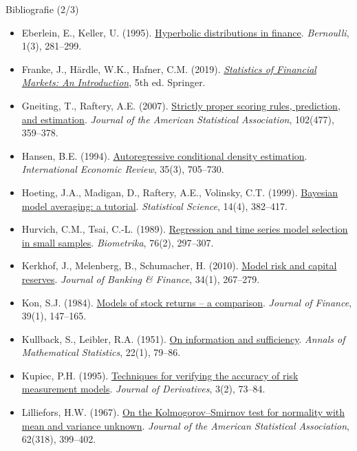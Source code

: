 \begin{frame}{Bibliografie (2/3)}
\itemsize{\tiny}
\begin{itemize}
    \item Eberlein, E., Keller, U. (1995). \href{https://doi.org/10.2307/3318481}{Hyperbolic distributions in finance}. \textit{Bernoulli}, 1(3), 281--299.
    \item Franke, J., Härdle, W.K., Hafner, C.M. (2019). \href{https://doi.org/10.1007/978-3-030-13751-9}{\textit{Statistics of Financial Markets: An Introduction}}, 5th ed. Springer.
    \item Gneiting, T., Raftery, A.E. (2007). \href{https://doi.org/10.1198/016214506000001437}{Strictly proper scoring rules, prediction, and estimation}. \textit{Journal of the American Statistical Association}, 102(477), 359--378.
    \item Hansen, B.E. (1994). \href{https://doi.org/10.2307/2527081}{Autoregressive conditional density estimation}. \textit{International Economic Review}, 35(3), 705--730.
    \item Hoeting, J.A., Madigan, D., Raftery, A.E., Volinsky, C.T. (1999). \href{https://doi.org/10.1214/ss/1009212519}{Bayesian model averaging: a tutorial}. \textit{Statistical Science}, 14(4), 382--417.
    \item Hurvich, C.M., Tsai, C.-L. (1989). \href{https://doi.org/10.1093/biomet/76.2.297}{Regression and time series model selection in small samples}. \textit{Biometrika}, 76(2), 297--307.
    \item Kerkhof, J., Melenberg, B., Schumacher, H. (2010). \href{https://doi.org/10.1016/j.jbankfin.2009.07.025}{Model risk and capital reserves}. \textit{Journal of Banking \& Finance}, 34(1), 267--279.
    \item Kon, S.J. (1984). \href{https://doi.org/10.1111/j.1540-6261.1984.tb03865.x}{Models of stock returns -- a comparison}. \textit{Journal of Finance}, 39(1), 147--165.
    \item Kullback, S., Leibler, R.A. (1951). \href{https://doi.org/10.1214/aoms/1177729694}{On information and sufficiency}. \textit{Annals of Mathematical Statistics}, 22(1), 79--86.
    \item Kupiec, P.H. (1995). \href{https://doi.org/10.3905/jod.1995.407942}{Techniques for verifying the accuracy of risk measurement models}. \textit{Journal of Derivatives}, 3(2), 73--84.
    \item Lilliefors, H.W. (1967). \href{https://doi.org/10.1080/01621459.1967.10482916}{On the Kolmogorov--Smirnov test for normality with mean and variance unknown}. \textit{Journal of the American Statistical Association}, 62(318), 399--402.

\end{itemize}
\end{frame}
